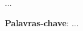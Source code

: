 \begin{resumo}[Resumo]
...

\vspace{\onelineskip}
    
 \noindent
 \textbf{Palavras-chave}: ...
\end{resumo}
